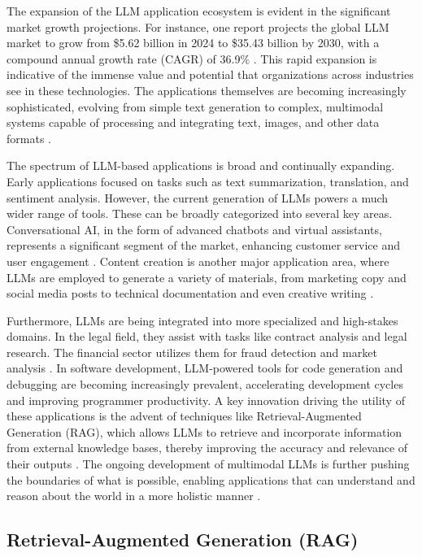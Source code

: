             The expansion of the LLM application ecosystem is evident in the significant market growth projections. For instance, one report projects the global LLM market to grow from \$5.62 billion in 2024 to \$35.43 billion by 2030, with a compound annual growth rate (CAGR) of 36.9\% \citep{GrandViewResearch2025}. This rapid expansion is indicative of the immense value and potential that organizations across industries see in these technologies. The applications themselves are becoming increasingly sophisticated, evolving from simple text generation to complex, multimodal systems capable of processing and integrating text, images, and other data formats \citep{Kaddour2023}.
            
            The spectrum of LLM-based applications is broad and continually expanding. Early applications focused on tasks such as text summarization, translation, and sentiment analysis. However, the current generation of LLMs powers a much wider range of tools. These can be broadly categorized into several key areas. Conversational AI, in the form of advanced chatbots and virtual assistants, represents a significant segment of the market, enhancing customer service and user engagement \citep{GrandViewResearch2025}. Content creation is another major application area, where LLMs are employed to generate a variety of materials, from marketing copy and social media posts to technical documentation and even creative writing \citep{V7Labs2025}.            
            
            Furthermore, LLMs are being integrated into more specialized and high-stakes domains. In the legal field, they assist with tasks like contract analysis and legal research. The financial sector utilizes them for fraud detection and market analysis \citep{V7Labs2025}. In software development, LLM-powered tools for code generation and debugging are becoming increasingly prevalent, accelerating development cycles and improving programmer productivity. A key innovation driving the utility of these applications is the advent of techniques like Retrieval-Augmented Generation (RAG), which allows LLMs to retrieve and incorporate information from external knowledge bases, thereby improving the accuracy and relevance of their outputs \citep{KeywordsAI2025}. The ongoing development of multimodal LLMs is further pushing the boundaries of what is possible, enabling applications that can understand and reason about the world in a more holistic manner \citep{Kaddour2023}.
        
        \subsection{Retrieval-Augmented Generation (RAG)} 

